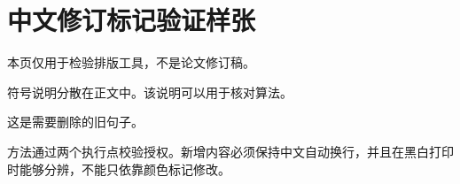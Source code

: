 \documentclass[UTF8,fontset=none]{ctexart}
\begin{document}
\section*{中文修订标记验证样张}
本页仅用于检验排版工具，不是论文修订稿。

符号说明分散在正文中。该说明可以用于核对算法。

这是需要删除的旧句子。

方法通过两个执行点校验授权。新增内容必须保持中文自动换行，并且在黑白打印时能够分辨，不能只依靠颜色标记修改。
\end{document}
